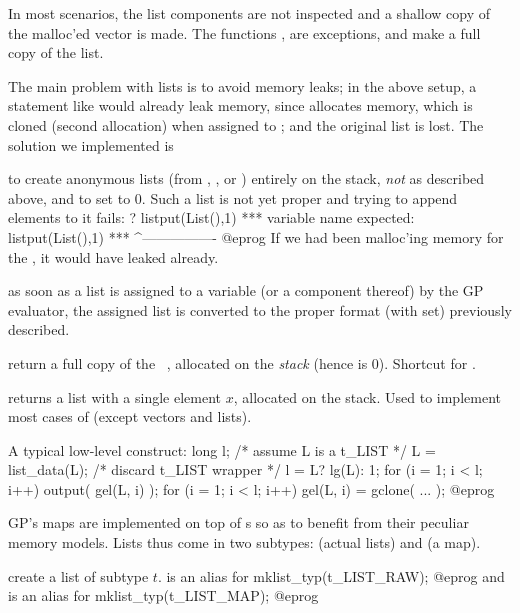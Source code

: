 In most  scenarios, the list components are not inspected
and a shallow copy of the malloc'ed vector is made. The functions
,  are exceptions, and make a full copy of
the list.

The main problem with lists is to avoid memory leaks; in the above setup,
a statement like  would already leak memory, since
 allocates memory, which is cloned (second allocation) when
assigned to ; and the original list is lost. The solution we
implemented is

\item to create anonymous lists (from , ,
 or ) entirely on the stack, \emph{not} as described
above, and to set  to $0$. Such a list is not yet proper and
trying to append elements to it fails:
\bprog
? listput(List(),1)
  ***   variable name expected: listput(List(),1)
  ***                                   ^----------------
@eprog\noindent
If we had been malloc'ing memory for the
, it would have leaked already.

\item as soon as a list is assigned to a variable (or a component thereof)
by the GP evaluator, the assigned list is converted to the proper format
(with  set) previously described.

 return a full copy of the ~,
allocated on the \emph{stack} (hence  is $0$). Shortcut for
.

 returns a list with a single element $x$,
allocated on the stack. Used to implement most cases of 
(except vectors and lists).

A typical low-level construct:
\bprog
  long l;
  /* assume L is a t_LIST */
  L = list_data(L); /* discard t_LIST wrapper */
  l = L? lg(L): 1;
  for (i = 1; i < l; i++) output( gel(L, i) );
  for (i = 1; i < l; i++) gel(L, i) = gclone( ... );
@eprog


GP's maps are implemented on top of s so as to benefit from
their peculiar memory models. Lists thus come in two subtypes: 
(actual lists) and  (a map).

 create a list of subtype $t$.
 is an alias for
\bprog
  mklist_typ(t_LIST_RAW);
@eprog
and
 is an alias for
\bprog
  mklist_typ(t_LIST_MAP);
@eprog

